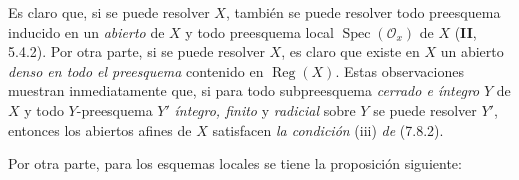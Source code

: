 \begin{env}[7.9.2]
\label{IV.2.s7.9.2-fr}
Es claro que, si se puede resolver $X$, también se puede resolver todo
preesquema inducido en un \emph{abierto} de $X$ y todo preesquema local
$\operatorname{Spec}(\mathcal O_x)$ de $X$ (\textbf{II}, 5.4.2).
Por otra parte, si se puede resolver $X$, es claro que existe en $X$
un abierto \emph{denso en todo el preesquema} contenido en $\operatorname{Reg}(X)$.
Estas observaciones muestran inmediatamente que, si para todo
subpreesquema \emph{cerrado e íntegro} $Y$ de $X$ y todo $Y$-preesquema
$Y'$ \emph{íntegro, finito} y \emph{radicial} sobre $Y$ se puede resolver
$Y'$, entonces los abiertos afines de $X$ satisfacen \emph{la condición}
(iii) \emph{de} (7.8.2).

Por otra parte, para los esquemas locales se tiene la proposición siguiente:
\end{env}
